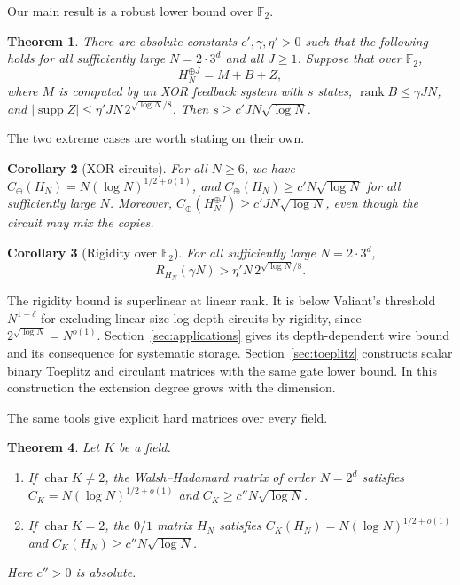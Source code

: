 \documentclass[11pt]{article}
\newtheorem{theorem}{Theorem}[section]
\newtheorem{corollary}[theorem]{Corollary}
\theoremstyle{definition}
\theoremstyle{remark}
\newcommand{\F}{\mathbb{F}}
\newcommand{\Cx}{C_{\oplus}}
\newcommand{\supp}{\operatorname{supp}}
\newcommand{\rk}{\operatorname{rank}}
\begin{document}
Our main result is a robust lower bound over $\F_2$.

\begin{theorem}\label{thm:main}
There are absolute constants $c',\gamma,\eta'>0$ such that the following
holds for all sufficiently large $N=2\cdot3^d$ and all $J\ge1$. Suppose
that over $\F_2$,
\[
H_N^{\oplus J}=M+B+Z,
\]
where $M$ is computed by an XOR feedback system with $s$ states,
$\rk B\le\gamma JN$, and $|\supp Z|\le\eta'JN\,2^{\sqrt{\log N}/8}$. Then
$s\ge c'JN\sqrt{\log N}$.
\end{theorem}

The two extreme cases are worth stating on their own.

\begin{corollary}[XOR circuits]\label{cor:xor}
For all $N\ge6$, we have $\Cx(H_N)=N(\log N)^{1/2+o(1)}$, and
$\Cx(H_N)\ge c'N\sqrt{\log N}$ for all sufficiently large $N$. Moreover,
$\Cx(H_N^{\oplus J})\ge c'JN\sqrt{\log N}$, even though the circuit may mix
the copies.
\end{corollary}

\begin{corollary}[Rigidity over $\F_2$]\label{cor:rigid}
For all sufficiently large $N=2\cdot3^d$,
\[
R_{H_N}(\gamma N)>\eta'N\,2^{\sqrt{\log N}/8}.
\]
\end{corollary}

The rigidity bound is superlinear at linear rank. It is below Valiant's
threshold $N^{1+\delta}$ for excluding linear-size log-depth circuits
by rigidity, since $2^{\sqrt{\log N}}=N^{o(1)}$.
Section~\ref{sec:applications} gives its depth-dependent wire
bound and its consequence for systematic storage.
Section~\ref{sec:toeplitz} constructs scalar binary Toeplitz and
circulant matrices with the same gate lower bound. In this construction
the extension degree grows with the dimension.

The same tools give explicit hard matrices over every field.

\begin{theorem}\label{thm:every}
Let $K$ be a field.
\begin{enumerate}
\item If $\operatorname{char}K\ne2$, the Walsh--Hadamard matrix of order
$N=2^d$ satisfies $C_K=N(\log N)^{1/2+o(1)}$ and $C_K\ge c''N\sqrt{\log N}$.
\item If $\operatorname{char}K=2$, the $0/1$ matrix $H_N$ satisfies
$C_K(H_N)=N(\log N)^{1/2+o(1)}$ and $C_K(H_N)\ge c''N\sqrt{\log N}$.
\end{enumerate}
Here $c''>0$ is absolute.
\end{theorem}
\end{document}
